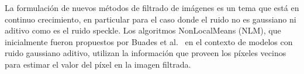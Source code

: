 \documentclass[11pt]{article}
\begin{document}


La formulación de nuevos métodos de filtrado de imágenes es un tema que está en continuo crecimiento, en particular para el caso donde el ruido no es gaussiano ni aditivo como es el ruido speckle. Los algoritmos NonLocalMeans (NLM), que inicialmente fueron propuestos por Buades et al.~\cite{Buades2005} en el contexto de modelos con ruido gaussiano aditivo, utilizan la información que proveen los píxeles vecinos para estimar el valor del píxel en la imagen filtrada. 
%
\end{document}
